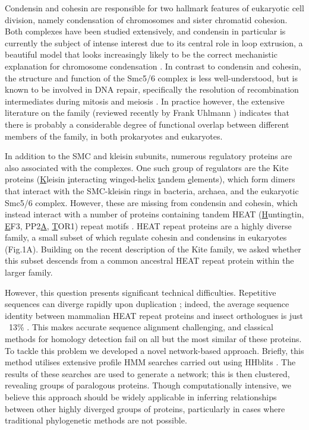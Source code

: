 \documentclass[a4paper,11pt,twoside,openright]{scrbook}
\begin{document}
Condensin and cohesin are responsible for two hallmark features of eukaryotic cell division, namely condensation of chromosomes and sister chromatid cohesion. Both complexes have been studied extensively, and condensin in particular is currently the subject of intense interest due to its central role in loop extrusion, a beautiful model that looks increasingly likely to be the correct mechanistic explanation for chromosome condensation \cite{Nasmyth2001a,Alipour2012,Goloborodko2016,Wang2017}. In contrast to condensin and cohesin, the structure and function of the Smc5/6 complex is less well-understood, but is known to be involved in DNA repair, specifically the resolution of recombination intermediates during mitosis and meiosis \cite{Ampatzidou2006,Farmer2011}. In practice however, the extensive literature on the family (reviewed recently by Frank Uhlmann \cite{Uhlmann2016}) indicates that there is probably a considerable degree of functional overlap between different members of the family, in both prokaryotes and eukaryotes.

In addition to the SMC and kleisin subunits, numerous regulatory proteins are also associated with the complexes. One such group of regulators are the Kite proteins (\underline{K}leisin \underline{i}nteracting winged-helix \underline{t}andem \underline{e}lements), which form dimers that interact with the SMC-kleisin rings in bacteria, archaea, and the eukaryotic Smc5/6 complex. However, these are missing from condensin and cohesin, which instead interact with a number of proteins containing tandem HEAT (\underline{H}untingtin, \underline{E}F3, PP2\underline{A}, \underline{T}OR1) repeat motifs \cite{Andrade1995}. HEAT repeat proteins are a highly diverse family, a small subset of which regulate cohesin and condensins in eukaryotes \cite{Hirano2016} (Fig.1A). Building on the recent description of the Kite family, we asked whether this subset descends from a common ancestral HEAT repeat protein within the larger family.

However, this question presents significant technical difficulties. Repetitive sequences can diverge rapidly upon duplication \cite{Persi2016}; indeed, the average sequence identity between mammalian HEAT repeat proteins and insect orthologues is just ~13\% \cite{Andrade2001c}. This makes accurate sequence alignment challenging, and classical methods for homology detection fail on all but the most similar of these proteins. To tackle this problem we developed a novel network-based approach. Briefly, this method utilises extensive profile HMM searches carried out using HHblits \cite{Remmert2011}. The results of these searches are used to generate a network; this is then clustered, revealing groups of paralogous proteins. Though computationally intensive, we believe this approach should be widely applicable in inferring relationships between other highly diverged groups of proteins, particularly in cases where traditional phylogenetic methods are not possible.
\end{document}
